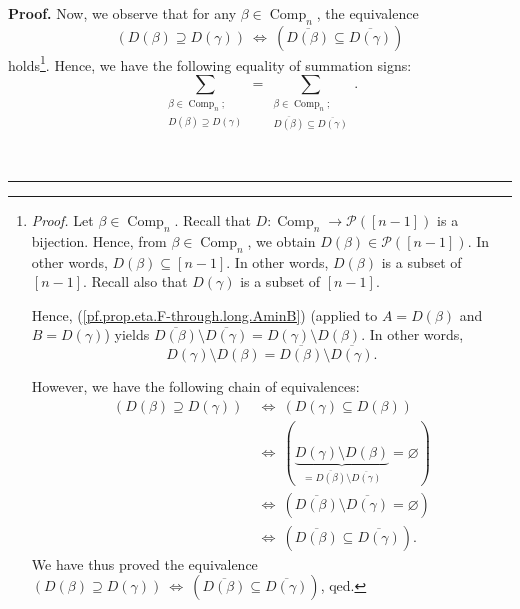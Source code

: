 \documentclass[numbers=enddot,12pt,final,onecolumn,notitlepage]{scrartcl}%
\theoremstyle{definition}
\newenvironment{proof}[1][Proof]{\noindent\textbf{#1.} }{\ \rule{0.5em}{0.5em}}
\let\sumnonlimits\sum
\renewcommand{\sum}{\sumnonlimits\limits}
\newenvironment{verlong}{}{}
\begin{document}
\begin{verlong}
\begin{proof}
Now, we observe that for any $\beta\in\operatorname*{Comp}\nolimits_{n}$, the
equivalence%
\[
\left(  D\left(  \beta\right)  \supseteq D\left(  \gamma\right)  \right)
\ \Longleftrightarrow\ \left(  \overline{D\left(  \beta\right)  }%
\subseteq\overline{D\left(  \gamma\right)  }\right)
\]
holds\footnote{\textit{Proof.} Let $\beta\in\operatorname*{Comp}\nolimits_{n}%
$. Recall that $D:\operatorname*{Comp}\nolimits_{n}\rightarrow\mathcal{P}%
\left(  \left[  n-1\right]  \right)  $ is a bijection. Hence, from $\beta
\in\operatorname*{Comp}\nolimits_{n}$, we obtain $D\left(  \beta\right)
\in\mathcal{P}\left(  \left[  n-1\right]  \right)  $. In other words,
$D\left(  \beta\right)  \subseteq\left[  n-1\right]  $. In other words,
$D\left(  \beta\right)  $ is a subset of $\left[  n-1\right]  $. Recall also
that $D\left(  \gamma\right)  $ is a subset of $\left[  n-1\right]  $.
\par
Hence, (\ref{pf.prop.eta.F-through.long.AminB}) (applied to $A=D\left(
\beta\right)  $ and $B=D\left(  \gamma\right)  $) yields $\overline{D\left(
\beta\right)  }\setminus\overline{D\left(  \gamma\right)  }=D\left(
\gamma\right)  \setminus D\left(  \beta\right)  $. In other words,%
\[
D\left(  \gamma\right)  \setminus D\left(  \beta\right)  =\overline{D\left(
\beta\right)  }\setminus\overline{D\left(  \gamma\right)  }.
\]
\par
However, we have the following chain of equivalences:%
\begin{align*}
\left(  D\left(  \beta\right)  \supseteq D\left(  \gamma\right)  \right)  \
&  \Longleftrightarrow\ \left(  D\left(  \gamma\right)  \subseteq D\left(
\beta\right)  \right) \\
&  \Longleftrightarrow\ \left(  \underbrace{D\left(  \gamma\right)  \setminus
D\left(  \beta\right)  }_{=\overline{D\left(  \beta\right)  }\setminus
\overline{D\left(  \gamma\right)  }}=\varnothing\right) \\
&  \Longleftrightarrow\ \left(  \overline{D\left(  \beta\right)  }%
\setminus\overline{D\left(  \gamma\right)  }=\varnothing\right) \\
&  \Longleftrightarrow\ \left(  \overline{D\left(  \beta\right)  }%
\subseteq\overline{D\left(  \gamma\right)  }\right)  .
\end{align*}
We have thus proved the equivalence $\left(  D\left(  \beta\right)  \supseteq
D\left(  \gamma\right)  \right)  \ \Longleftrightarrow\ \left(  \overline
{D\left(  \beta\right)  }\subseteq\overline{D\left(  \gamma\right)  }\right)
$, qed.}. Hence, we have the following equality of summation signs:%
\begin{equation}
\sum_{\substack{\beta\in\operatorname*{Comp}\nolimits_{n};\\D\left(
\beta\right)  \supseteq D\left(  \gamma\right)  }}=\sum_{\substack{\beta
\in\operatorname*{Comp}\nolimits_{n};\\\overline{D\left(  \beta\right)
}\subseteq\overline{D\left(  \gamma\right)  }}}.
\label{pf.prop.eta.F-through.long.eqsum}%
\end{equation}



\end{proof}
\end{verlong}
\end{document}
